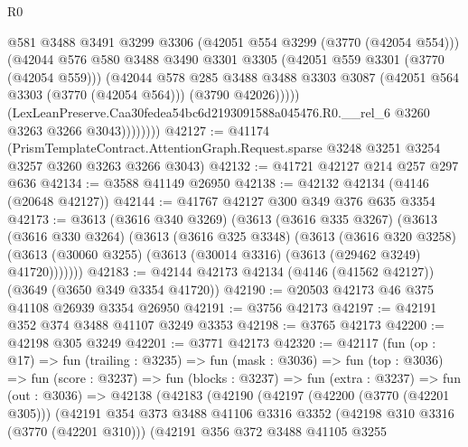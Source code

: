 \begin{lexlean}{R0}
\begin{coremodule}
                      @581
                      @3488
                      @3491
                      @3299
                      @3306
                      (@42051 @554 @3299 (@3770 (@42054 @554)))
                      (@42044
                        @576
                        @580
                        @3488
                        @3490
                        @3301
                        @3305
                        (@42051 @559 @3301 (@3770 (@42054 @559)))
                        (@42044
                          @578
                          @285
                          @3488
                          @3488
                          @3303
                          @3087
                          (@42051 @564 @3303 (@3770 (@42054 @564)))
                          (@3790 @42026)))))
                  (LexLeanPreserve.Caa30fedea54bc6d2193091588a045476.R0.__rel_6
                    @3260
                    @3263
                    @3266
                    @3043))))))))
@42127 := @41174
    (PrismTemplateContract.AttentionGraph.Request.sparse
      @3248
      @3251
      @3254
      @3257
      @3260
      @3263
      @3266
      @3043)
@42132 := @41721 @42127 @214 @257 @297 @636
@42134 := @3588 @41149 @26950
@42138 := @42132 @42134 (@4146 (@20648 @42127))
@42144 := @41767 @42127 @300 @349 @376 @635 @3354
@42173 := @3613
    (@3616 @340 @3269)
    (@3613
      (@3616 @335 @3267)
      (@3613
        (@3616 @330 @3264)
        (@3613
          (@3616 @325 @3348)
          (@3613
            (@3616 @320 @3258)
            (@3613 (@30060 @3255) (@3613 (@30014 @3316) (@3613 (@29462 @3249) @41720)))))))
@42183 := @42144 @42173 @42134 (@4146 (@41562 @42127)) (@3649 (@3650 @349 @3354 @41720))
@42190 := @20503 @42173 @46 @375 @41108 @26939 @3354 @26950
@42191 := @3756 @42173
@42197 := @42191 @352 @374 @3488 @41107 @3249 @3353
@42198 := @3765 @42173
@42200 := @42198 @305 @3249
@42201 := @3771 @42173
@42320 := @42117
    (fun (op : @17) =>
    fun (trailing : @3235) =>
    fun (mask : @3036) =>
    fun (top : @3036) =>
    fun (score : @3237) =>
    fun (blocks : @3237) =>
    fun (extra : @3237) =>
    fun (out : @3036) =>
    @42138
      (@42183
        (@42190
          (@42197
            (@42200 (@3770 (@42201 @305)))
            (@42191
              @354
              @373
              @3488
              @41106
              @3316
              @3352
              (@42198 @310 @3316 (@3770 (@42201 @310)))
              (@42191
                @356
                @372
                @3488
                @41105
                @3255

\end{coremodule}
\end{lexlean}
